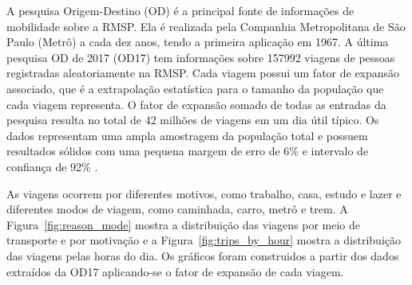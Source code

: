 A pesquisa Origem-Destino (OD) é a principal fonte de informações de mobilidade
sobre a RMSP. Ela é realizada pela Companhia Metropolitana de São Paulo (Metrô)
a cada dez anos, tendo a primeira aplicação em 1967. A última pesquisa OD de
2017 (OD17) tem informações sobre \num{157992} viagens de pessoas registradas
aleatoriamente na RMSP. Cada viagem possui um fator de expansão associado, que é
a extrapolação estatística para o tamanho da população que cada viagem
representa. O fator de expansão somado de todas as entradas da pesquisa resulta
no total de 42 milhões de viagens em um dia útil típico. Os dados representam
uma ampla amostragem da população total e possuem resultados sólidos com uma
pequena margem de erro de 6\% e intervalo de confiança de 92\%
\citep[p.18]{odmanual:17}.

As viagens ocorrem por diferentes motivos, como trabalho, casa, estudo e lazer e
diferentes modos de viagem, como caminhada, carro, metrô e trem. A
Figura~\ref{fig:reason_mode} mostra a distribuição das viagens por meio de
transporte e por motivação e a Figura~\ref{fig:trips_by_hour} mostra a
distribuição das viagens pelas horas do dia. Os gráficos foram construidos a
partir dos dados extraídos da OD17 aplicando-se o fator de expansão de cada
viagem.

